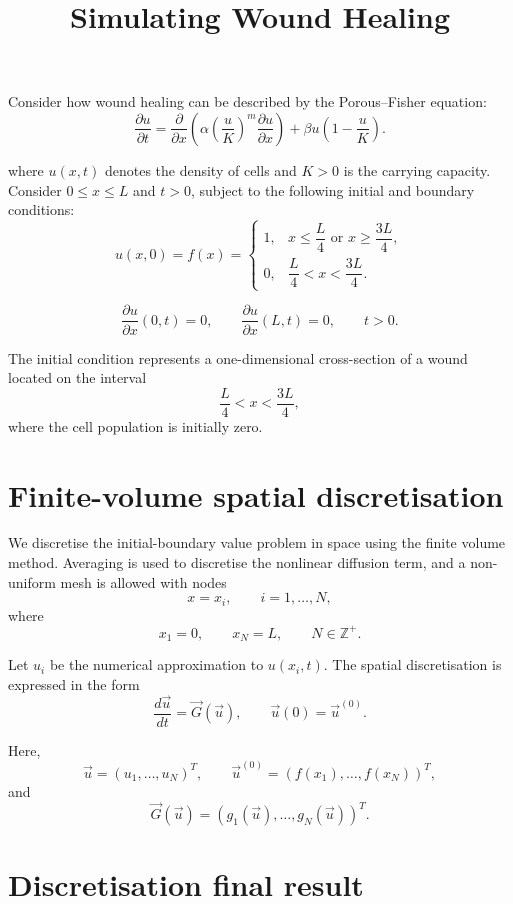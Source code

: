 \documentclass[12pt]{article}
\title{Simulating Wound Healing}
\author{}
\date{}
\begin{document}
\maketitle

Consider how wound healing can be described by the Porous--Fisher equation:
\[
\frac{\partial u}{\partial t}
=
\frac{\partial}{\partial x}
\left(
\alpha
\left(\frac{u}{K}\right)^m
\frac{\partial u}{\partial x}
\right)
+
\beta u
\left(1-\frac{u}{K}\right).
\]

where \(u(x,t)\) denotes the density of cells and \(K>0\) is the carrying capacity. Consider \(0 \leq x \leq L\) and \(t>0\), subject to the following initial and boundary conditions:
\[
u(x,0)
=
f(x)
=
\begin{cases}
1, & x \leq \dfrac{L}{4} \text{ or } x \geq \dfrac{3L}{4}, \\[6pt]
0, & \dfrac{L}{4} < x < \dfrac{3L}{4}.
\end{cases}
\]

\[
\frac{\partial u}{\partial x}(0,t)=0,
\qquad
\frac{\partial u}{\partial x}(L,t)=0,
\qquad
t>0.
\]

The initial condition represents a one-dimensional cross-section of a wound located on the interval
\[
\frac{L}{4} < x < \frac{3L}{4},
\]
where the cell population is initially zero.

\section{Finite-volume spatial discretisation}

We discretise the initial-boundary value problem in space using the finite volume method. Averaging is used to discretise the nonlinear diffusion term, and a non-uniform mesh is allowed with nodes
\[
x=x_i,
\qquad
i=1,\dots,N,
\]
where
\[
x_1=0,
\qquad
x_N=L,
\qquad
N \in \mathbb{Z}^{+}.
\]

Let \(u_i\) be the numerical approximation to \(u(x_i,t)\). The spatial discretisation is expressed in the form
\[
\frac{d\vec{u}}{dt}
=
\vec{G}(\vec{u}),
\qquad
\vec{u}(0)
=
\vec{u}^{(0)}.
\]

Here,
\[
\vec{u}
=
(u_1,\dots,u_N)^T,
\qquad
\vec{u}^{(0)}
=
(f(x_1),\dots,f(x_N))^T,
\]
and
\[
\vec{G}(\vec{u})
=
(g_1(\vec{u}),\dots,g_N(\vec{u}))^T.
\]

\section{Discretisation final result}
\end{document}
